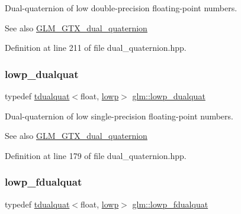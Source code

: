 Dual-\/quaternion of low double-\/precision floating-\/point numbers.

\begin{DoxySeeAlso}{See also}
\mbox{\hyperlink{group__gtx__dual__quaternion}{G\+L\+M\+\_\+\+G\+T\+X\+\_\+dual\+\_\+quaternion}} 
\end{DoxySeeAlso}


Definition at line 211 of file dual\+\_\+quaternion.\+hpp.

\mbox{\label{group__gtx__dual__quaternion_ga4888200ed911e4887c2423fed74ad362}} 
\subsubsection{\texorpdfstring{lowp\_dualquat}{lowp\_dualquat}}
{\footnotesize\ttfamily typedef \mbox{\hyperlink{structglm_1_1tdualquat}{tdualquat}}$<$float, \mbox{\hyperlink{namespaceglm_a0f04f086094c747d227af4425893f545ae161af3fc695e696ce3bf69f7332bc2d}{lowp}}$>$ \mbox{\hyperlink{group__gtx__dual__quaternion_ga4888200ed911e4887c2423fed74ad362}{glm\+::lowp\+\_\+dualquat}}}

Dual-\/quaternion of low single-\/precision floating-\/point numbers.

\begin{DoxySeeAlso}{See also}
\mbox{\hyperlink{group__gtx__dual__quaternion}{G\+L\+M\+\_\+\+G\+T\+X\+\_\+dual\+\_\+quaternion}} 
\end{DoxySeeAlso}


Definition at line 179 of file dual\+\_\+quaternion.\+hpp.

\mbox{\label{group__gtx__dual__quaternion_ga797f6d2679ab6773c1f057b97bf95111}} 
\subsubsection{\texorpdfstring{lowp\_fdualquat}{lowp\_fdualquat}}
{\footnotesize\ttfamily typedef \mbox{\hyperlink{structglm_1_1tdualquat}{tdualquat}}$<$float, \mbox{\hyperlink{namespaceglm_a0f04f086094c747d227af4425893f545ae161af3fc695e696ce3bf69f7332bc2d}{lowp}}$>$ \mbox{\hyperlink{group__gtx__dual__quaternion_ga797f6d2679ab6773c1f057b97bf95111}{glm\+::lowp\+\_\+fdualquat}}}

